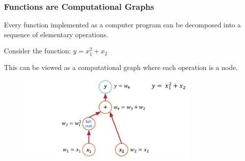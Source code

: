 \documentclass[notes]{beamer}
\begin{document}
\begin{frame}
\frametitle{Functions are Computational Graphs}

Every function implemented as a computer program can be decomposed into a sequence of elementary operations.

Consider the function: $y = x_1^2 + x_2$


This can be viewed as a computational graph where each operation is a node.

\begin{figure}[ht]
	\centering
	\includegraphics[width=0.8\textwidth]{figs/ad2.png}
\end{figure}

\end{frame}
\end{document}
